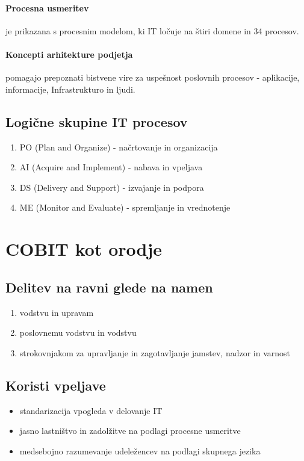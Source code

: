 \documentclass[a4paper,12pt]{report}
\begin{document}
\paragraph{Procesna usmeritev} je prikazana s procesnim modelom, ki IT ločuje na štiri domene in 34 procesov.

\paragraph{Koncepti arhitekture podjetja} pomagajo prepoznati bistvene vire za uspešnost poslovnih procesov - aplikacije, informacije, Infrastrukturo in ljudi.

\subsection{Logične skupine IT procesov}
\begin{enumerate}
   \item PO (Plan and Organize) - načrtovanje in organizacija
   \item AI (Acquire and Implement) - nabava in vpeljava
   \item DS (Delivery and Support) - izvajanje in podpora
   \item ME (Monitor and Evaluate) - spremljanje in vrednotenje
\end{enumerate}

\section{COBIT kot orodje}

\subsection{Delitev na ravni glede na namen}
\begin{enumerate}
   \item vodstvu in upravam
   \item poslovnemu vodstvu in vodstvu 
   \item strokovnjakom za upravljanje in zagotavljanje jamstev, nadzor in varnost
\end{enumerate}

\subsection{Koristi vpeljave}
\begin{itemize}
   \item standarizacija vpogleda v delovanje IT
   \item jasno lastništvo in zadolžitve na podlagi procesne usmeritve
   \item medsebojno razumevanje udeležencev na podlagi skupnega jezika
\end{itemize}
\end{document}
